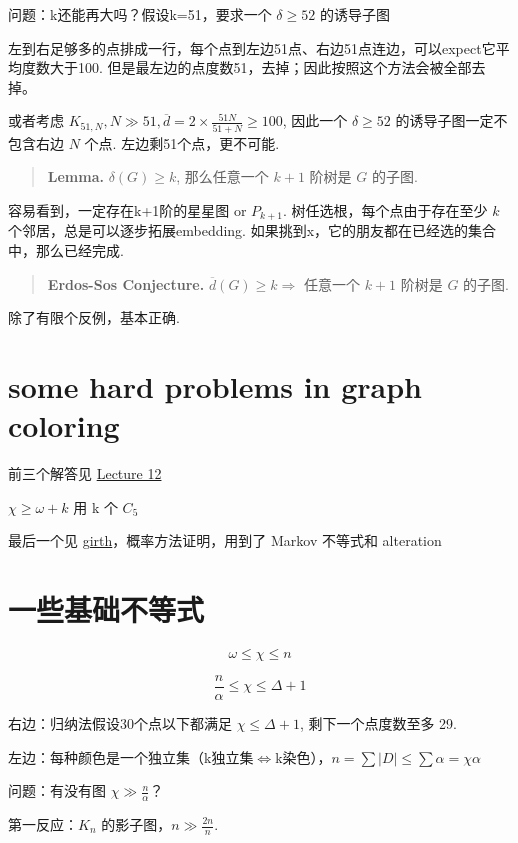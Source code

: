 问题：k还能再大吗？假设k=51，要求一个 $\delta\geq52$ 的诱导子图

左到右足够多的点排成一行，每个点到左边51点、右边51点连边，可以expect它平均度数大于100. 但是最左边的点度数51，去掉；因此按照这个方法会被全部去掉。

或者考虑 $K_{51,N},N\gg 51,\overline{d}=2\times\frac{51N}{51+N}\geq100$, 因此一个 $\delta\geq 52$ 的诱导子图一定不包含右边 $N$ 个点. 左边剩51个点，更不可能.

\begin{quotation}
\textbf{Lemma.} $\delta(G)\geq k$, 那么任意一个 $k+1$ 阶树是 $G$ 的子图.
\end{quotation}

容易看到，一定存在k+1阶的星星图 or $P_{k+1}$. 树任选根，每个点由于存在至少 $k$ 个邻居，总是可以逐步拓展embedding. 如果挑到x，它的朋友都在已经选的集合中，那么已经完成.

\begin{quotation}
\textbf{Erdos-Sos Conjecture.} $\overline{d}(G)\geq k\Rightarrow$ 任意一个 $k+1$ 阶树是 $G$ 的子图.
\end{quotation}

除了有限个反例，基本正确.

\section{some hard problems in graph coloring}


前三个解答见 \href{250428.md}{Lecture 12}

$\chi\geq\omega+k$ 用 k 个 $C_5$

最后一个见 \href{https://math.mit.edu/~fox/MAT307-lecture13.pdf}{girth}，概率方法证明，用到了 Markov 不等式和 alteration

\section{一些基础不等式}

\[
\omega\leq\chi\leq n
\]

\[
\frac{n}{\alpha}\leq\chi\leq\Delta+1
\]

右边：归纳法假设30个点以下都满足 $\chi\leq\Delta+1$, 剩下一个点度数至多 29.

左边：每种颜色是一个独立集（k独立集$\iff$k染色），$n=\sum |D|\leq\sum\alpha=\chi\alpha$

问题：有没有图 $\chi\gg \frac{n}{\alpha}$？

第一反应：$K_n$ 的影子图，$n\gg \frac{2n}{n}$.

